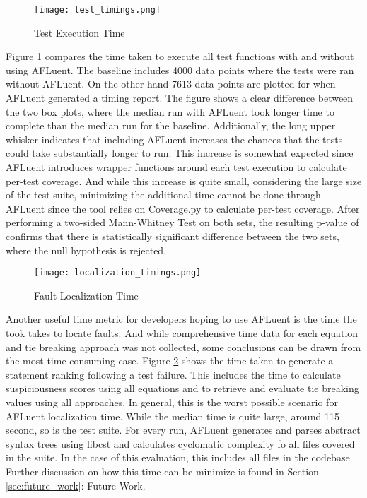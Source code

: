 \begin{figure}[!htb]
	\begin{center}
		\texttt{[image: test\_timings.png]}
		\caption{\label{fig:test_timings} Test Execution Time}
	\end{center}
\end{figure}

Figure \ref{fig:test_timings} compares the time taken to execute all test
functions with and without using AFLuent. The baseline includes
4000 data points where the tests were ran without AFLuent. On the other hand
7613 data points are plotted for when AFLuent generated a timing report. The
figure shows a clear difference between the two box plots, where the median run with
AFLuent took longer time to complete than the median run for the baseline.
Additionally, the long upper whisker indicates that
including AFLuent increases the chances that the tests could take substantially
longer to run. This increase is somewhat expected since AFLuent introduces
wrapper functions around each test execution to calculate per-test coverage. And
while this increase is quite small, considering the large size of the test suite,
minimizing the additional time cannot be done through AFLuent since the tool
relies on Coverage.py to calculate per-test coverage. After performing a two-sided
Mann-Whitney Test on both sets, the resulting p-value of
 confirms that there is statistically significant difference
between the two sets, where the null hypothesis is rejected.

\begin{figure}[!htb]
	\begin{center}
		\texttt{[image: localization\_timings.png]}
		\caption{\label{fig:localization_timings} Fault Localization Time}
	\end{center}
\end{figure}

Another useful time metric for developers hoping to use AFLuent is the time the
took takes to locate faults. And while
comprehensive time data for each equation and tie breaking approach was not
collected, some conclusions can be drawn from the most time consuming case.
Figure \ref{fig:localization_timings} shows the time taken to generate a
statement ranking following a test failure. This includes the time to calculate
suspiciousness scores using all equations and to retrieve and evaluate tie
breaking values using all approaches. In general, this is the worst possible
scenario for AFLuent localization time. While the median time is quite large,
around 115 second, so is the test suite. For every run, AFLuent generates and parses
abstract syntax trees using libcst and calculates cyclomatic complexity fo all
files covered in the suite. In the case of this evaluation, this includes all
files in the codebase. Further discussion on how this time can be minimize is
found in Section \ref{sec:future_work}: Future Work.

